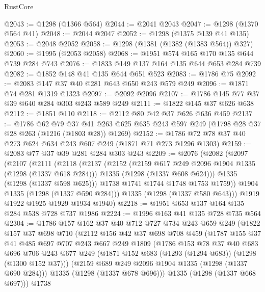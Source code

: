 \begin{lexlean}{RustCore}
\begin{coremodule}
@2043 := @1298 (@1366 @564)
@2044 := @2041 @2043
@2047 := @1298 (@1370 @564 @41)
@2048 := @2044 @2047
@2052 := @1298 (@1375 @139 @41 @135)
@2053 := @2048 @2052
@2058 := @1298 (@1381 (@1382 (@1383 @564)) @327)
@2060 := @1995 (@2053 @2058)
@2068 := @1951 @574 @165 @170 @135 @644 @739 @284 @743
@2076 := @1833 @149 @137 @164 @135 @644 @653 @284 @739
@2082 := @1852 @148 @41 @135 @644 @651 @523
@2083 := @1786 @75
@2092 := @2083 @147 @37 @40 @281 @643 @650 @243 @579 @249
@2096 := @1871 @74 @281 @1319 @1323
@2097 := @2092 @2096
@2107 := @1786 @145 @77 @37 @39 @640 @284 @303 @243 @589 @249
@2111 := @1822 @145 @37 @626 @638
@2112 := @1851 @110
@2118 := @2112 @80 @42 @37 @626 @636 @459
@2137 := @1786
    @62
    @79
    @37
    @41
    @263
    @625
    @635
    @243
    @597
    @249
    (@1798 @28 @37 @28 @263 (@1216 (@1803 @28)) @1269)
@2152 := @1786 @72 @78 @37 @40 @273 @624 @634 @243 @607 @249 (@1871 @71 @273 @1296 @1303)
@2159 := @2083 @77 @37 @39 @281 @284 @303 @243
@2209 := @2076
    (@2082
      (@2097
        (@2107
          (@2111
            (@2118
              (@2137
                (@2152
                  (@2159 @617 @249 @2096 @1904 @1335 (@1298 (@1337 @618 @284)))
                  @1335
                  (@1298 (@1337 @608 @624)))
                @1335
                (@1298 (@1337 @598 @625)))
              @1738
              @1741
              @1744
              @1748
              @1753
              @1759))
          @1904
          @1335
          (@1298 (@1337 @590 @284)))
        @1335
        (@1298 (@1337 @580 @643)))
      @1919
      @1922
      @1925
      @1929
      @1934
      @1940)
@2218 := @1951 @653 @137 @164 @135 @284 @538 @728 @737 @1986
@2224 := @1996 @163 @41 @135 @728 @735 @564
@2304 := @1786
    @157
    @162
    @37
    @40
    @712
    @727
    @734
    @243
    @659
    @249
    (@1822
      @157
      @37
      @698
      @710
      (@2112
        @156
        @42
        @37
        @698
        @708
        @459
        (@1787
          @155
          @37
          @41
          @485
          @697
          @707
          @243
          @667
          @249
          @1809
          (@1786
            @153
            @78
            @37
            @40
            @683
            @696
            @706
            @243
            @677
            @249
            (@1871 @152 @683 (@1293 (@1294 @683)) (@1298 (@1300 @152 @37)))
            (@2159 @689 @249 @2096 @1904 @1335 (@1298 (@1337 @690 @284)))
            @1335
            (@1298 (@1337 @678 @696)))
          @1335
          (@1298 (@1337 @668 @697)))
        @1738

\end{coremodule}
\end{lexlean}

